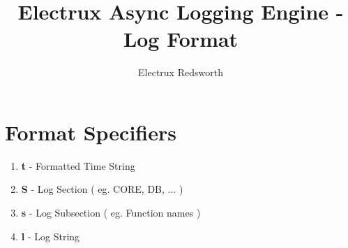 \documentclass{article}
\author{Electrux Redsworth}
\title{Electrux Async Logging Engine - Log Format}
\begin{document}
\maketitle

\section{Format Specifiers}

\begin{enumerate}

\item \textbf{t} - Formatted Time String
\item \textbf{S} - Log Section ( eg. CORE, DB, ... )
\item \textbf{s} - Log Subsection ( eg. Function names )
\item \textbf{l} - Log String

\end{enumerate}
\end{document}
